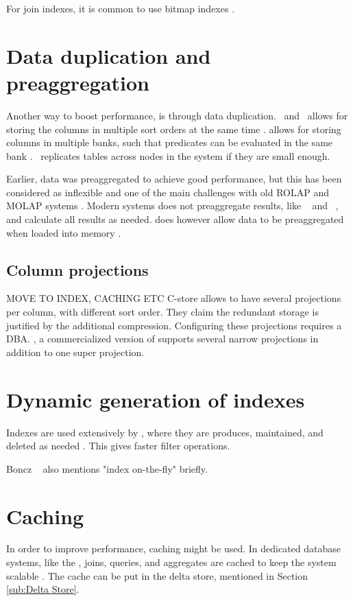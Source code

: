 For join indexes, it is common to use bitmap indexes \cite{Bjorklund2011-wh}.

\section{Data duplication and preaggregation}
\label{sec:Data duplication and preaggregation}
Another way to boost performance, is through data duplication. \cstore~and \vertica~allows for storing the columns in multiple sort orders at the same time \cite{Stonebraker2005-qz, Lamb2012-kg}. \blink allows for storing columns in multiple banks, such that predicates can be evaluated in the same bank \cite{Johnson2008-cp}. \exasol~replicates tables across nodes in the system if they are small enough.

Earlier, data was preaggregated to achieve good performance, but this has been considered as inflexible and one of the main challenges with old ROLAP and MOLAP systems \cite{Boncz2002-yj}. Modern systems does not preaggregate results, like \sapnw~\cite{Lemke2010-is} and \qlikview~\cite{Qlik2014-vd}, and calculate all results as needed. \qlikview does however allow data to be preaggregated when loaded into memory \cite{Qlik2011-yc}.

\subsection{Column projections} MOVE TO INDEX, CACHING ETC
\label{sub:Column projections} 
C-store allows to have several projections per column, with different sort order. They claim the redundant storage is justified by the additional compression. Configuring these projections requires a DBA. , a commercialized version of  supports several narrow projections in addition to one super projection.

\section{Dynamic generation of indexes}
\label{sec:Dynamic generation of indexes}
Indexes are used extensively by \exasol, where they are produces, maintained, and deleted as needed \cite{Exasol2014-xh}. This gives faster filter operations.

Boncz \ea~\cite{Boncz2006-md} also mentions "index on-the-fly" briefly.

\section{Caching}
\label{sec:Caching}
In order to improve performance, caching might be used. In dedicated database systems, like the \exasol, joins, queries, and aggregates are cached to keep the system scalable \cite{Exasol2014-xh, Plattner2014-fr}. The cache can be put in the delta store, mentioned in Section \ref{sub:Delta Store}.

